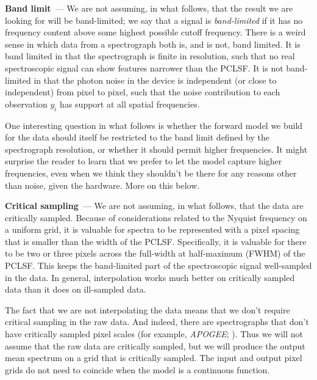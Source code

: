 \documentclass[modern]{aastex631}
\renewcommand{\paragraph}[1]{\medskip\par\noindent\textbf{#1}~---}
\begin{document}
\paragraph{Band limit}
We are not assuming, in what follows, that the result we are looking for will be band-limited;
we say that a signal is \emph{band-limited} if it has no frequency content above some highest possible cutoff frequency.
There is a weird sense in which data from a spectrograph both is, and is not, band limited.
It is band limited in that the spectrograph is finite in resolution, such that no real spectroscopic signal can show features narrower than the PCLSF.
It is not band-limited in that the photon noise in the device is independent (or close to independent) from pixel to pixel, such that the noise contribution to each observation $y_i$ has support at all spatial frequencies.

One interesting question in what follows is whether the forward model we build for the data should itself be restricted to the band limit defined by the spectrograph resolution, or whether it should permit higher frequencies.
It might surprise the reader to learn that we prefer to let the model capture higher frequencies, even when we think they shouldn't be there for any reasons other than noise, given the hardware.
More on this below. %

\paragraph{Critical sampling}
We are not assuming, in what follows, that the data are critically sampled.
Because of considerations related to the Nyquist frequency on a uniform grid, it is valuable for spectra to be represented with a pixel spacing that is smaller than the width of the PCLSF.
Specifically, it is valuable for there to be two or three pixels across the full-width at half-maximum (FWHM) of the PCLSF.
This keeps the band-limited part of the spectroscopic signal well-sampled in the data.
In general, interpolation works much better on critically sampled data than it does on ill-sampled data.

The fact that we are not interpolating the data means that we don't require critical sampling in the raw data.
And indeed, there are spectrographs that don't have critically sampled pixel scales (for example, \textsl{APOGEE}; \citealt{apogee}).
Thus we will not assume that the raw data are critically sampled, but we will produce the output mean spectrum on a grid that is critically sampled.
The input and output pixel grids do not need to coincide when the model is a continuous function.
\end{document}
